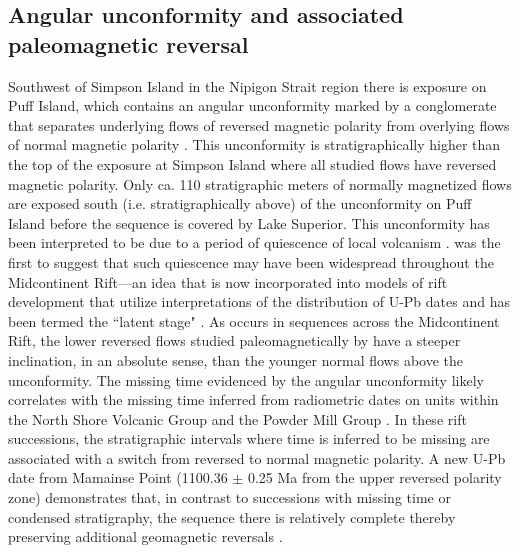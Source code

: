 \documentclass[draft,gc]{AGUTeX}
\begin{document}
\begin{article}
\subsection{Angular unconformity and associated paleomagnetic reversal}

Southwest of Simpson Island in the Nipigon Strait region there is exposure on Puff Island, which contains an angular unconformity marked by a conglomerate that separates underlying flows of reversed magnetic polarity from overlying flows of normal magnetic polarity \citep{Halls1974a}. This unconformity is stratigraphically higher than the top of the exposure at Simpson Island where all studied flows have reversed magnetic polarity. Only ca. 110 stratigraphic meters of normally magnetized flows are exposed south (i.e. stratigraphically above) of the unconformity on Puff Island before the sequence is covered by Lake Superior. This unconformity has been interpreted to be due to a period of quiescence of local volcanism \citep{Halls1974a}. \citet{Halls1974a} was the first to suggest that such quiescence may have been widespread throughout the Midcontinent Rift---an idea that is now incorporated into models of rift development that utilize interpretations of the distribution of U-Pb dates and has been termed the ``latent stage" \citep{Vervoort2007a}. As occurs in sequences across the Midcontinent Rift, the lower reversed flows studied paleomagnetically by \citet{Halls1974a} have a steeper inclination, in an absolute sense, than the younger normal flows above the unconformity. The missing time evidenced by the angular unconformity likely correlates with the missing time inferred from radiometric dates on units within the North Shore Volcanic Group and the Powder Mill Group \citep{Davis1997a, Zartman1997a}. In these rift successions, the stratigraphic intervals where time is inferred to be missing are associated with a switch from reversed to normal magnetic polarity. A new U-Pb date from Mamainse Point (1100.36 $\pm$ 0.25 Ma from the upper reversed polarity zone) demonstrates that, in contrast to successions with missing time or condensed stratigraphy, the sequence there is relatively complete thereby preserving additional geomagnetic reversals \citep{Swanson-Hysell2014a}. 

%
%
%


\end{article}
\end{document}
